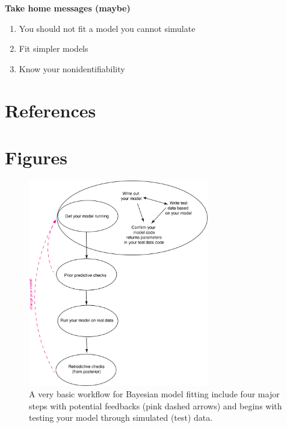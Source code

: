 \documentclass[11pt]{article}
\begin{document}
{{\bf Take home messages (maybe)}
\begin{enumerate}
\item You should not fit a model you cannot simulate
\item Fit simpler models
\item Know your nonidentifiability
\end{enumerate}

\newpage
\section{References}
\vspace{-5ex}



\newpage
\section{Figures}

\begin{figure}[ht]
\centering
\noindent \includegraphics[width=0.7\textwidth]{figures/workflow.png}
\caption{A very basic workflow for Bayesian model fitting include four major steps with potential feedbacks (pink dashed arrows) and begins with testing your model through simulated (test) data.}
\label{fig:workflow}
\end{figure}

}
\end{document}

